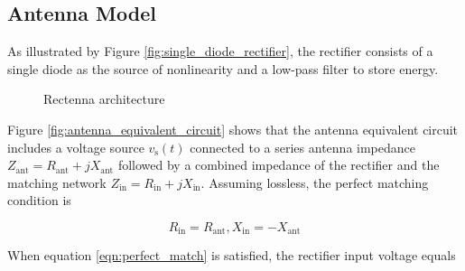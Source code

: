 \subsection{Antenna Model}\label{sec:antenna-model}

As illustrated by Figure \ref{fig:single_diode_rectifier}, the rectifier consists of a single diode as the source of nonlinearity and a low-pass filter to store energy.

%
%

\begin{figure}[ht]
  \centering
  \caption{Rectenna architecture}
  \label{fig:rectenna_architecture}
\end{figure}

Figure \ref{fig:antenna_equivalent_circuit} shows that the antenna equivalent circuit includes a voltage source ${v_{\text{s}}}(t)$ connected to a series antenna impedance ${Z_{{\text{ant}}}} = {R_{{\text{ant}}}} + j{X_{{\text{ant}}}}$ followed by a combined impedance of the rectifier and the matching network ${Z_{{\text{in}}}} = {R_{{\text{in}}}} + j{X_{{\text{in}}}}$. Assuming lossless, the perfect matching condition is

\begin{equation}\label{eqn:perfect_match}
  {R_{{\text{in}}}} = {R_{{\text{ant}}}},{X_{{\text{in}}}} =  - {X_{{\text{ant}}}}
\end{equation}

When equation \ref{eqn:perfect_match} is satisfied, the rectifier input voltage equals

